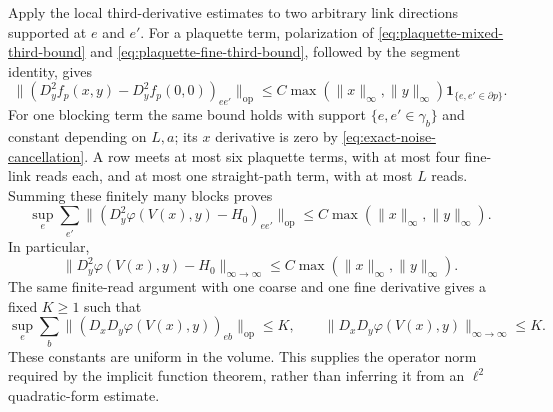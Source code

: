 \documentclass[10pt,reqno]{amsart}
\theoremstyle{definition}
\theoremstyle{remark}
\numberwithin{equation}{section}
\numberwithin{figure}{section}
\begin{document}
Apply the local third-derivative estimates to two arbitrary link
directions supported at $e$ and $e'$. For a plaquette term, polarization
of \eqref{eq:plaquette-mixed-third-bound} and
\eqref{eq:plaquette-fine-third-bound}, followed by the segment identity,
gives
\begin{equation}\label{eq:local-hessian-block-perturbation}
\|(D_y^2f_p(x,y)-D_y^2f_p(0,0))_{ee'}\|_{\mathrm{op}}
\le C\max(\|x\|_\infty,\|y\|_\infty)
\mathbf1_{\{e,e'\in\partial p\}}.
\end{equation}
For one blocking term the same bound holds with support
$\{e,e'\in\gamma_b\}$ and constant depending on $L,a$; its $x$ derivative
is zero by \eqref{eq:exact-noise-cancellation}. A row meets at most six
plaquette terms, with at most four fine-link reads each, and at most
one straight-path term, with at most $L$ reads. Summing these finitely
many blocks proves
\begin{equation}\label{eq:hessian-perturbation-row-sum}
\boxed{\sup_e\sum_{e'}
\|(D_y^2\varphi(V(x),y)-H_0)_{ee'}\|_{\mathrm{op}}
\le C\max(\|x\|_\infty,\|y\|_\infty).}
\end{equation}
In particular,
\begin{equation}\label{eq:hessian-maximum-norm-perturbation}
\|D_y^2\varphi(V(x),y)-H_0\|_{\infty\to\infty}
\le C\max(\|x\|_\infty,\|y\|_\infty).
\end{equation}
The same finite-read argument with one coarse and one fine derivative
gives a fixed $K\ge1$ such that
\begin{equation}\label{eq:mixed-gradient-row-sum}
\sup_e\sum_b\|(D_xD_y\varphi(V(x),y))_{eb}\|_{\mathrm{op}}
\le K,\qquad
\|D_xD_y\varphi(V(x),y)\|_{\infty\to\infty}\le K.
\end{equation}
These constants are uniform in the volume. This supplies the operator
norm required by the implicit function theorem, rather than inferring
it from an $\ell^2$ quadratic-form estimate.
\end{document}
